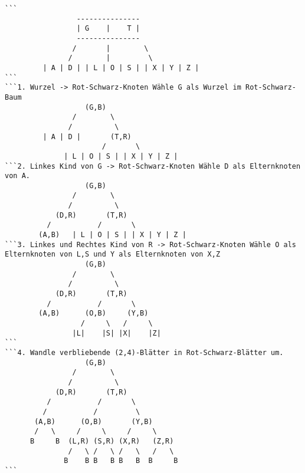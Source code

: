 \begin{verbatim}
```
                 ---------------
                 | G    |    T |
                 ---------------
                /       |        \
               /        |         \
         | A | D | | L | O | S | | X | Y | Z |
```
```1. Wurzel -> Rot-Schwarz-Knoten Wähle G als Wurzel im Rot-Schwarz-Baum
                   (G,B)
                /        \
               /          \
         | A | D |       (T,R)
                       /       \
              | L | O | S | | X | Y | Z |
```2. Linkes Kind von G -> Rot-Schwarz-Knoten Wähle D als Elternknoten von A.
                   (G,B)
                /        \
               /          \
            (D,R)       (T,R)
          /           /       \
        (A,B)   | L | O | S | | X | Y | Z |
```3. Linkes und Rechtes Kind von R -> Rot-Schwarz-Knoten Wähle O als Elternknoten von L,S und Y als Elternknoten von X,Z
                   (G,B)
                /        \
               /          \
            (D,R)       (T,R)
          /           /       \
        (A,B)      (O,B)     (Y,B)
                  /     \   /     \
                |L|    |S| |X|    |Z|
```
```4. Wandle verbliebende (2,4)-Blätter in Rot-Schwarz-Blätter um. 
                   (G,B)
                /        \
               /          \
            (D,R)       (T,R)
          /           /       \
         /           /         \
       (A,B)      (O,B)       (Y,B)
       /   \     /     \     /     \
      B     B  (L,R) (S,R) (X,R)   (Z,R)
               /   \ /   \ /   \   /   \
              B    B B   B B   B  B     B
```
\end{verbatim}